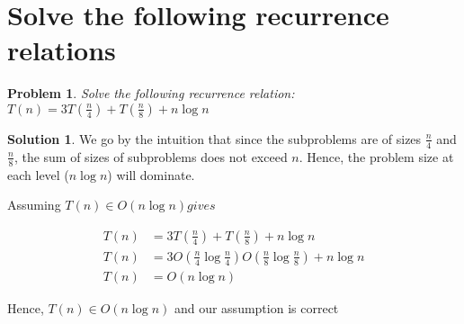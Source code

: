 \documentclass[11pt]{article}
\newtheorem*{problem}{Problem}
\theoremstyle{definition}
\newtheorem*{solution}{Solution}
\begin{document}
\section{Solve the following recurrence relations}
\begin{problem}
    Solve the following recurrence relation: $T(n) = 3T\left( \frac n 4 \right) + T \left(\frac n 8 \right) + n \log n$
\end{problem}
\begin{solution}
    We go by the intuition that since the subproblems are of sizes
    $\frac n 4$ and $\frac n 8$, the sum of sizes of subproblems does not
    exceed $n$. Hence, the problem size at each level ($n \log n$) will
    dominate.

    Assuming $T(n) \in O(n \log n) gives$

    \begin{align*}
        T(n) &= 3T \left( \frac n 4 \right) + T \left(\frac n 8 \right) + n \log n \\
        T(n) &= 3O \left( \frac n 4 \log{\frac n 4} \right)  O \left(\frac n 8 \log{\frac n 8} \right) + n \log n \\
        T(n) &= O \left( n \log n \right) \tag{$ O \left( n \log n \right)$ dominates the other two complexities}
    \end{align*}

    Hence, $T(n) \in O(n \log n)$ and our assumption is correct

\end{solution}
\end{document}
